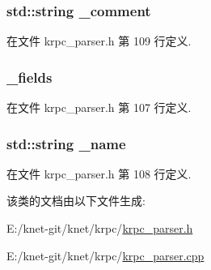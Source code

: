 \subsubsection[{\+\_\+comment}]{\setlength{\rightskip}{0pt plus 5cm}std\+::string \+\_\+comment\hspace{0.3cm}{\ttfamily [private]}}\label{classkrpc__attribute__t_a8023a5250068c80d006205154d89046f}


在文件 krpc\+\_\+parser.\+h 第 109 行定义.

\hypertarget{classkrpc__attribute__t_a062184377b756132b4cbfb218bf2f67b}{}
\subsubsection[{\+\_\+fields}]{ \+\_\+fields\hspace{0.3cm}{\ttfamily [private]}}\label{classkrpc__attribute__t_a062184377b756132b4cbfb218bf2f67b}


在文件 krpc\+\_\+parser.\+h 第 107 行定义.

\hypertarget{classkrpc__attribute__t_aaf2ed934b37cbbd236fdd1b01a5f5005}{}
\subsubsection[{\+\_\+name}]{\setlength{\rightskip}{0pt plus 5cm}std\+::string \+\_\+name\hspace{0.3cm}{\ttfamily [private]}}\label{classkrpc__attribute__t_aaf2ed934b37cbbd236fdd1b01a5f5005}


在文件 krpc\+\_\+parser.\+h 第 108 行定义.



该类的文档由以下文件生成\+:\begin{DoxyCompactItemize}
\item 
E\+:/knet-\/git/knet/krpc/\hyperlink{krpc__parser_8h}{krpc\+\_\+parser.\+h}\item 
E\+:/knet-\/git/knet/krpc/\hyperlink{krpc__parser_8cpp}{krpc\+\_\+parser.\+cpp}\end{DoxyCompactItemize}
